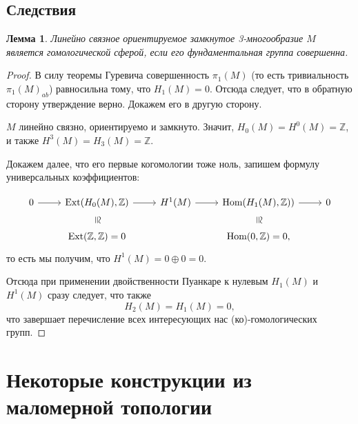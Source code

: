 \documentclass[a4paper, 12pt]{article}
\newtheorem*{lemma}{Лемма}
\theoremstyle{definition}
\begin{document}
    \subsection{Следствия}

        \begin{lemma}
            Линейно связное ориентируемое замкнутое 3-многообразие $M$ является гомологической сферой, если его фундаментальная группа совершенна. 
        \end{lemma}

        \begin{proof}
            В силу теоремы Гуревича совершенность $\pi_1(M)$ (то есть тривиальность $\pi_1(M)_{ab}$) равносильна тому, что $H_1(M) = 0$. Отсюда следует, что в обратную сторону утверждение верно. Докажем его в другую сторону.
                        
            $M$ линейно связно, ориентируемо и замкнуто. Значит, $H_0(M) = H^0(M) = \mathbb{Z}$, и также $H^3(M) = H_3(M) = \mathbb{Z}$. 
                      
            Докажем далее, что его первые когомологии тоже ноль, запишем формулу универсальных коэффициентов:


                \[ \begin{tikzcd}
                    0 & {\textnormal{Ext}(H_0(M), \mathbb{Z}) } \arrow[draw=none]{d}[marking]{\cong} & {H^1(M)} & {\textnormal{Hom}(H_1(M), \mathbb{Z})) } \arrow[draw=none]{d}[marking]{\cong} & 0 \\
                    & {\textnormal{Ext}(\mathbb{Z}, \mathbb{Z}) = 0} & & \textnormal{Hom}(0, \mathbb{Z}) = 0,
                    \arrow[from=1-1, to=1-2]
                    \arrow[from=1-2, to=1-3]
                    \arrow[from=1-3, to=1-4]
                    \arrow[from=1-4, to=1-5]
                \end{tikzcd} \]
            то есть мы получим, что $H^1(M) = 0 \oplus 0 = 0$. 
    
            Отсюда при применении двойственности Пуанкаре к нулевым $H_1(M)$ и $H^1(M)$ сразу следует, что также \[H_2(M) = H_1(M) = 0,\]
            что завершает перечисление всех интересующих нас (ко)-гомологических групп.
        \end{proof}

\section{Некоторые конструкции из маломерной топологии}
\end{document}
